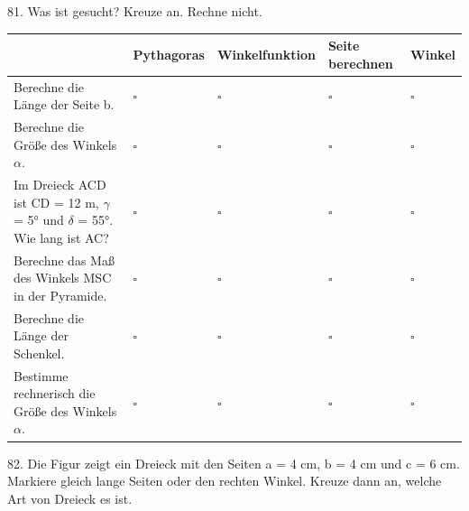 \documentclass[11pt]{article}
\begin{document}
\par\Needspace*{0.55\textheight}
\begin{pfaufg}{}{81.}{}
Was ist gesucht? Kreuze an. Rechne nicht.
\par\smallskip\noindent \begingroup\renewcommand{\arraystretch}{1.4}\begin{tabular}{|>{\raggedright\arraybackslash}p{4.3cm}|>{\centering\arraybackslash\hyphenpenalty=0}p{1.55cm}|>{\centering\arraybackslash\hyphenpenalty=0}p{1.55cm}|>{\centering\arraybackslash\hyphenpenalty=0}p{1.55cm}|>{\centering\arraybackslash\hyphenpenalty=0}p{1.55cm}|}\hline  & {\scriptsize\hspace{0pt}Pythagoras} & {\scriptsize\hspace{0pt}Winkelfunktion} & {\scriptsize\hspace{0pt}Seite berechnen} & {\scriptsize\hspace{0pt}Winkel} \\ \hline Berechne die Länge der Seite b. & $\square$ & $\square$ & $\square$ & $\square$ \\ \hline Berechne die Größe des Winkels $\alpha$. & $\square$ & $\square$ & $\square$ & $\square$ \\ \hline Im Dreieck ACD ist CD = 12 m, $\gamma$ = 5° und $\delta$ = 55°. Wie lang ist AC? & $\square$ & $\square$ & $\square$ & $\square$ \\ \hline Berechne das Maß des Winkels MSC in der Pyramide. & $\square$ & $\square$ & $\square$ & $\square$ \\ \hline Berechne die Länge der Schenkel. & $\square$ & $\square$ & $\square$ & $\square$ \\ \hline Bestimme rechnerisch die Größe des Winkels $\alpha$. & $\square$ & $\square$ & $\square$ & $\square$ \\ \hline\end{tabular}\endgroup\par
\end{pfaufg}
\pfgruppe{}
\begin{pfaufg}{}{82.}{}
Die Figur zeigt ein Dreieck mit den Seiten a = 4 cm, b = 4 cm und c = 6 cm. Markiere gleich lange Seiten oder den rechten Winkel. Kreuze dann an, welche Art von Dreieck es ist. 
\par\smallskip\noindent {}\par
{}
\end{pfaufg}
\end{document}
